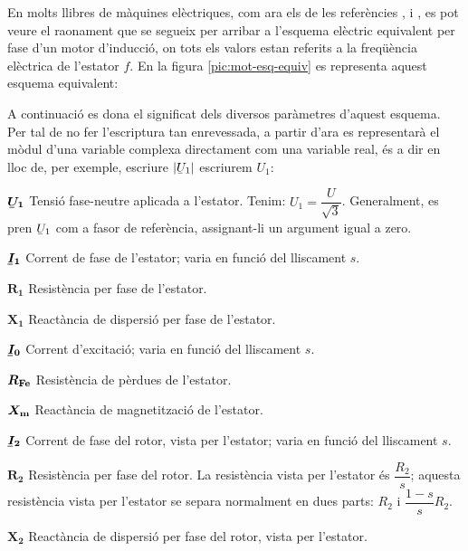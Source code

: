 En molts llibres de màquines elèctriques, com ara els de les referències \cite{CHA}, \cite{FIT} i \cite{JFM}, es pot veure el raonament que se segueix per arribar a l'esquema elèctric equivalent per fase d'un motor d'inducció, on tots els valors estan referits a la freqüència elèctrica de l'estator $f$. En la figura \vref{pic:mot-esq-equiv} es representa aquest esquema equivalent:

\begin{center}
    
    \label{pic:mot-esq-equiv}
\end{center}

A continuació es dona el significat dels diversos paràmetres d'aquest esquema. Per tal de no fer l'escriptura tan enrevessada, a partir d'ara es representarà el mòdul d'una variable complexa  directament com una variable real, és a dir en lloc de, per exemple, escriure $|\cmplx{U}_1|$ escriurem $U_1$:

\begin{list}{}
   {\setlength{\labelwidth}{12mm} \setlength{\leftmargin}{12mm} \setlength{\labelsep}{2mm}}
   \item[$\boldsymbol{\cmplx{U}_1}$] Tensió fase-neutre aplicada a l'estator. Tenim: $U_1 = \dfrac{U}{\sqrt{3}}$. Generalment,   es pren $\cmplx{U}_1$ com a fasor de referència, assignant-li un argument igual a zero.
   \item[$\boldsymbol{\cmplx{I}_1}$] Corrent de fase de l'estator; varia en funció del lliscament $s$.
   \item[$\boldsymbol{R_1}$] Resistència per fase de l'estator.
   \item[$\boldsymbol{X_1}$] Reactància de dispersió per fase de l'estator.
   \item[$\boldsymbol{\cmplx{I}_0}$] Corrent d'excitació; varia en funció del lliscament $s$.
   \item[$\boldsymbol{R_\mathrm{Fe}}$] Resistència de pèrdues de l'estator.
   \item[$\boldsymbol{X_\mathrm{m}}$] Reactància de magnetització de l'estator.
   \item[$\boldsymbol{\cmplx{I}_2}$] Corrent de fase del rotor, vista per l'estator; varia en funció del lliscament $s$.
   \item[$\boldsymbol{R_2}$] Resistència per fase del rotor. La resistència vista per l'estator és $\dfrac{R_2}{s}$; aquesta resistència vista per l'estator se separa normalment en dues parts: $R_2$ i $\dfrac{1-s}{s} R_2$.
   \item[$\boldsymbol{X_2}$] Reactància de dispersió per fase del rotor, vista per l'estator.
\end{list}

